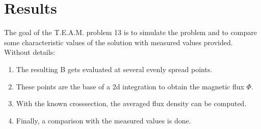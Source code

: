 \documentclass[11pt]{article}
\begin{document}
    \hypertarget{results}{%
\section{Results}\label{results}}

The goal of the T.E.A.M. problem 13 is to simulate the problem and to
compare some characteristic values of the solution with measured values
provided.\\
Without details: 
\begin{enumerate}
\item The resulting B gets evaluated at several evenly
spread points. 
\item These points are the base of a 2d integration to
obtain the magnetic flux \(\Phi\). 
\item With the known crosssection, the
averaged flux density can be computed. 
\item Finally, a comparison with the
measured values is done.
\end{enumerate}
\end{document}
